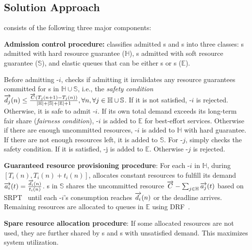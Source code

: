 \vspace{-0.1in}	
\subsection{Solution Approach}
\label{sec:solution_approach}

\name consists of the following three major components:

\noindent\textbf{Admission control procedure:} 
\name classifies admitted {\burstq}s and {\batchq}s into three classes: {\burstq}s admitted with hard resource guarantee ($\mathbb{H}$), {\burstq}s admitted with soft resource guarantee ($\mathbb{S}$), and elastic queues that can be either {\burstq}s or {\batchq}s ($\mathbb{E}$).

Before admitting \burstq-$i$, \name checks if admitting it invalidates any resource guarantees committed for {\burstq}s in $\mathbb{H}\cup\mathbb{S}$, i.e., the \emph{safety condition} $\protect\overrightarrow{d_j}(n) \leq \frac{\protect\overrightarrow{C}\left(T_j(n+1)-T_j(n)\right)}{|\mathbb{H}|+|\mathbb{S}|+|\mathbb{E}|+1}, \forall n, \forall j \in \mathbb{H}\cup\mathbb{S}$.
If it is not satisfied, \burstq-$i$ is rejected. Otherwise, it is safe to admit \burstq-$i$. If its own total demand exceeds its long-term fair share (\emph{fairness condition}), \burstq-$i$ is added to $\mathbb{E}$ for best-effort services. Otherwise if there are enough uncommitted resources, \burstq-$i$ is added to $\mathbb{H}$ with hard guarantee. If there are not enough resources left, it is added to $\mathbb{S}$. 
For {\batchq}-$j$, \name simply checks the safety condition. If it is satisfied, {\batchq}-j is added to $\mathbb{E}$. Otherwise {\batchq}-$j$ is rejected.


\noindent\textbf{Guaranteed resource provisioning procedure}: 
For each {\burstq}-$i$ in $\mathbb{H}$, during $[T_i(n),T_i(n)+t_i(n)]$, \name allocates constant resources to fulfill its demand $\protect\overrightarrow{a_i}(t)=\frac{\protect\overrightarrow{d_i}(n)}{t_i(n)}$. %
{\burstq}s in $\mathbb{S}$ shares the uncommitted resource $\protect\overrightarrow{C}-\sum_{j\in \mathbb{H}}\protect\overrightarrow{a_j}(t)$ based on SRPT~\cite{bansal2001analysis} until each {\burstq}-$i$'s consumption reaches $\protect\overrightarrow{d_i}(n)$ or the deadline arrives. 
Remaining resources are allocated to queues in $\mathbb{E}$ using DRF~\cite{drf}. %


\noindent\textbf{Spare resource allocation procedure}:
If some allocated resources are not used, they are further shared by {\batchq}s and {\burstq}s with unsatisfied demand. This maximizes system utilization.






